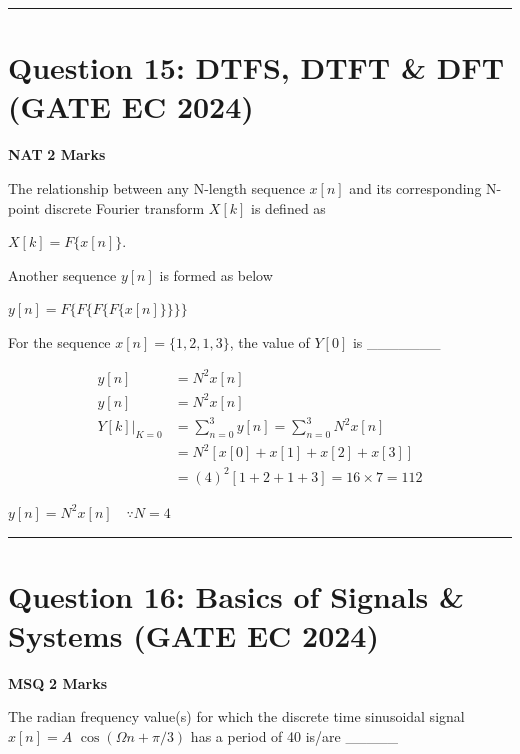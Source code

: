 \documentclass[11pt,a4paper]{article}
\begin{document}
\vspace{1.5em}
\hrule
\vspace{1.5em}

\section*{Question 15: DTFS, DTFT \& DFT (GATE EC 2024)}
\noindent \textbf{\color{primary}NAT} \hfill \textbf{\color{secondary}2 Marks}


\noindent The relationship between any $\mathrm{N}$-length sequence $x[n]$ and its corresponding $\mathrm{N}$-point discrete Fourier transform $X[k]$ is defined as

$X[k]=F\{x[n]\}$.

Another sequence $y[n]$ is formed as below

$y[n]=F\{F\{F\{F\{x[n]\}\}\}\}$

For the sequence $x[n]=\{1,2,1,3\}$, the value of $Y[0]$ is \_\_\_\_\_\_\_


\begin{tcolorbox}[solbox, title=Detailed Solution -- Question 15]
\[
\begin{aligned}
y[n] & =N^{2} x[n] \\
y[n] & =N^{2} x[n] \\
\left.Y[k]\right|_{K=0} & =\sum_{n=0}^{3} y[n]=\sum_{n=0}^{3} N^{2} x[n] \\
& =N^{2}[x[0]+x[1]+x[2]+x[3]] \\
& =(4)^{2}[1+2+1+3]=16 \times 7=112
\end{aligned}
\]

 $y[n]=N^{2} x[n] \quad \because N=4$
\end{tcolorbox}

\vspace{1.5em}
\hrule
\vspace{1.5em}

\section*{Question 16: Basics of Signals \& Systems (GATE EC 2024)}
\noindent \textbf{\color{primary}MSQ} \hfill \textbf{\color{secondary}2 Marks}


\noindent The radian frequency value(s) for which the discrete time sinusoidal signal $x[n]=A$ $\cos (\Omega n+\pi / 3)$ has a period of 40 is/are  \_\_\_\_\_
\end{document}
